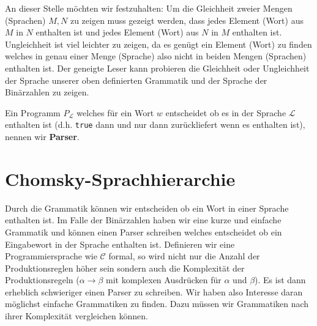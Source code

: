 An dieser Stelle möchten wir festzuhalten: Um die Gleichheit zweier Mengen (Sprachen) $M,N$ zu zeigen muss gezeigt werden, dass jedes Element (Wort) aus $M$ in $N$ enthalten ist
und jedes Element (Wort) aus $N$ in $M$ enthalten ist.
Ungleichheit ist viel leichter zu zeigen, da es genügt ein Element (Wort) zu finden welches in genau einer Menge (Sprache) also nicht in beiden Mengen (Sprachen) enthalten ist. Der geneigte Leser kann probieren die Gleichheit oder Ungleichheit der Sprache unserer oben definierten Grammatik und der Sprache der Binärzahlen zu zeigen.

\begin{defn}
Ein Programm $P_{\mathcal{L}}$ welches für ein Wort $w$ entscheidet ob es in der Sprache $\mathcal{L}$ enthalten ist (d.h. \verb|true| dann und nur dann zurückliefert wenn es enthalten ist), nennen wir \textbf{Parser}.
\end{defn}

\section{Chomsky-Sprachhierarchie}
Durch die Grammatik können wir entscheiden ob ein Wort in einer Sprache enthalten ist.
Im Falle der Binärzahlen haben wir eine kurze und einfache Grammatik und können einen Parser schreiben
welches entscheidet ob ein Eingabewort in der Sprache enthalten ist.
Definieren wir eine Programmiersprache wie $\mathcal{C}$ formal, so wird nicht nur die Anzahl der Produktionsreglen höher sein
sondern auch die Komplexität der Produktionsregeln ($\alpha \to \beta$ mit komplexen Ausdrücken für $\alpha$ und $\beta$).
Es ist dann erheblich schwieriger einen Parser zu schreiben.
Wir haben also Interesse daran möglichst einfache Grammatiken zu finden. Dazu müssen wir
Grammatiken nach ihrer Komplexität vergleichen können.

